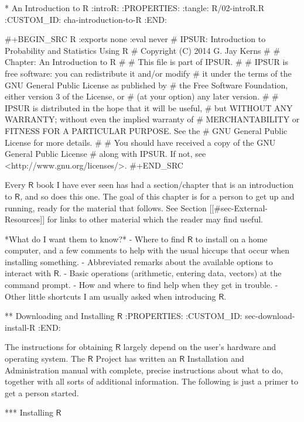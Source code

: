 * An Introduction to R                                               :introR:
:PROPERTIES:
:tangle: R/02-introR.R
:CUSTOM_ID: cha-introduction-to-R
:END:

#+BEGIN_SRC R :exports none :eval never
#    IPSUR: Introduction to Probability and Statistics Using R
#    Copyright (C) 2014 G. Jay Kerns
#
#    Chapter: An Introduction to R
#
#    This file is part of IPSUR.
#
#    IPSUR is free software: you can redistribute it and/or modify
#    it under the terms of the GNU General Public License as published by
#    the Free Software Foundation, either version 3 of the License, or
#    (at your option) any later version.
#
#    IPSUR is distributed in the hope that it will be useful,
#    but WITHOUT ANY WARRANTY; without even the implied warranty of
#    MERCHANTABILITY or FITNESS FOR A PARTICULAR PURPOSE.  See the
#    GNU General Public License for more details.
#
#    You should have received a copy of the GNU General Public License
#    along with IPSUR.  If not, see <http://www.gnu.org/licenses/>.
#+END_SRC

Every \(\mathsf{R}\) book I have ever seen has had a section/chapter
that is an introduction to \(\mathsf{R}\), and so does this one.  The
goal of this chapter is for a person to get up and running, ready for
the material that follows.  See Section [[#sec-External-Resources]] for links
to other material which the reader may find useful.

*What do I want them to know?*
- Where to find \(\mathsf{R}\) to install on a home computer, and a
  few comments to help with the usual hiccups that occur when
  installing something.
- Abbreviated remarks about the available options to interact with
  \(\mathsf{R}\).
- Basic operations (arithmetic, entering data, vectors) at the command
  prompt.
- How and where to find help when they get in trouble.
- Other little shortcuts I am usually asked when introducing
  \(\mathsf{R}\).

** Downloading and Installing \(\mathsf{R}\)
:PROPERTIES:
:CUSTOM_ID: sec-download-install-R
:END:  

The instructions for obtaining \(\mathsf{R}\) largely depend on the
user's hardware and operating system. The \(\mathsf{R}\) Project has
written an \(\mathsf{R}\) Installation and Administration manual with
complete, precise instructions about what to do, together with all
sorts of additional information. The following is just a primer to get
a person started.

*** Installing \(\mathsf{R}\) 

